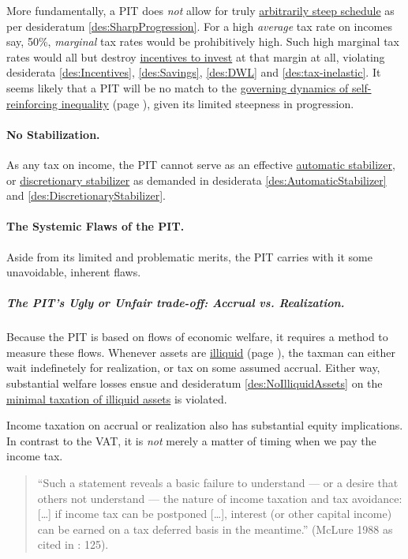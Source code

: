 More fundamentally, a PIT does \emph{not} allow for truly \hyperref[des:SharpProgression]{arbitrarily steep schedule} as per desideratum \ref{des:SharpProgression}. For a high \emph{average} tax rate on incomes say, 50\%, \emph{marginal} tax rates would be prohibitively high. Such high marginal tax rates would all but destroy \hyperref[des:Incentives]{incentives to invest} at that margin at all, violating desiderata \ref{des:Incentives}, \ref{des:Savings}, \ref{des:DWL} and \ref{des:tax-inelastic}. It seems likely that a PIT will be no match to the \hyperref[sec:GovDynofIneq]{governing dynamics of self-reinforcing inequality} (page \pageref{sec:GovDynofIneq}), given its limited steepness in progression.

\paragraph{No Stabilization.} As any tax on income, the PIT cannot serve as an effective \hyperref[des:AutomaticStabilizer]{automatic stabilizer}, or \hyperref[des:DiscretionaryStabilizer]{discretionary stabilizer} as demanded in desiderata \ref{des:AutomaticStabilizer} and \ref{des:DiscretionaryStabilizer}.

\paragraph{The Systemic Flaws of the PIT.} Aside from its limited and problematic merits, the PIT carries with it some unavoidable, inherent flaws.

\subparagraph{The PIT's Ugly or Unfair trade-off: Accrual vs. Realization.} Because the PIT is based on flows of economic welfare, it requires a method to measure these flows. Whenever assets are \hyperref[sec:Illiquid]{illiquid} (page \pageref{sec:Illiquid}), the taxman can either wait indefinetely for realization, or tax on some assumed accrual. Either way, substantial welfare losses ensue and desideratum \ref{des:NoIlliquidAssets} on the \hyperref[des:NoIlliquidAssets]{minimal taxation of illiquid assets} is violated.

Income taxation on accrual or realization also has substantial equity implications. In contrast to the VAT, it is \emph{not} merely a matter of timing when we pay the income tax.

\begin{quote}
	``Such a statement reveals a basic failure to understand --- or a desire that others not understand --- the nature of income taxation and tax avoidance: [\ldots] if income tax can be postponed [\ldots], interest (or other capital income) can be earned on a tax deferred basis in the meantime.'' (McLure 1988 as cited in \citealt{Seidman1997}: 125).
\end{quote}

